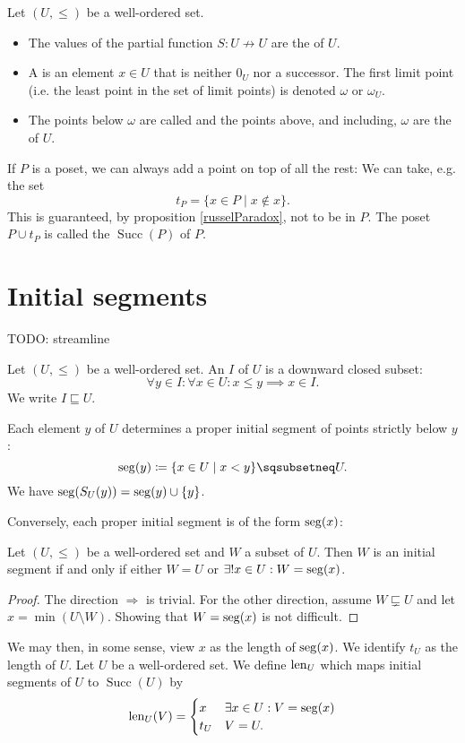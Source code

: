 \begin{definition}
Let $(U,\leq)$ be a well-ordered set.
\begin{itemize}
\item The values of the partial function $S: U\not\to U$ are the  of $U$.
\item A  is an element $x\in U$ that is neither $0_U$ nor a successor. The first limit point (i.e. the least point in the set of limit points) is denoted $\omega$ or $\omega_U$.
\item The points below $\omega$ are called  and the points above, and including, $\omega$ are the  of $U$.
\end{itemize}
\end{definition}

If $P$ is a poset, we can always add a point on top of all the rest: We can take, e.g. the set
\[ t_P = \{ x\in P\;|\;x\notin x \}. \]
This is guaranteed, by proposition \ref{russelParadox}, not to be in $P$.
The poset $P\cup t_P$ is called the  $\operatorname{Succ}(P)$ of $P$.

\section{Initial segments}
TODO: streamline
\begin{definition}
Let $(U,\leq)$ be a well-ordered set. An  $I$ of $U$ is a downward closed subset:
\[ \forall y\in I: \forall x\in U: x\leq y \implies x\in I. \]
We write $I \sqsubseteq U$.
\end{definition}
Each element $y$ of $U$ determines a proper initial segment of points strictly below $y$:
\[ \seg(y) \defeq \{ x\in U\;|\; x < y \} \sqsubsetneq U. \]
We have $\operatorname{seg}(S_U(y)) = \operatorname{seg}(y)\cup\{y\}$.

Conversely, each proper initial segment is of the form $\operatorname{seg}(x)$:
\begin{proposition}
Let $(U,\leq)$ be a well-ordered set and $W$ a subset of $U$. Then $W$ is an initial segment \textup{if and only if} either $W=U$ or $\exists! x\in U: W = \operatorname{seg}(x)$.
\end{proposition}
\begin{proof}
The direction $\Rightarrow$ is trivial. For the other direction, assume $W \sqsubsetneq U$ and let $x= \min(U\setminus W)$. Showing that $W=\operatorname{seg}(x)$ is not difficult.
\end{proof}
We may then, in some sense, view $x$ as the length of $\operatorname{seg}(x)$. We identify $t_U$ as the length of $U$. Let $U$ be a well-ordered set. We define $\operatorname{len}_U$ which maps initial segments of $U$ to $\operatorname{Succ}(U)$ by
\[ \operatorname{len}_U(V) = \begin{cases}
x & \exists x\in U: V=\operatorname{seg}(x) \\
t_U & V = U.
\end{cases} \]


